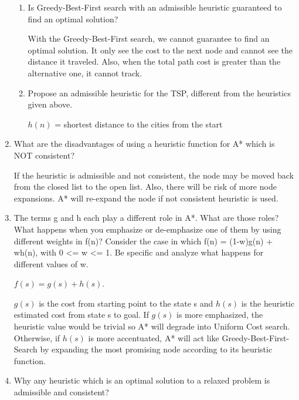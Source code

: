 \documentclass[12pt]{article}
\begin{document}
\begin{enumerate}
\begin{enumerate}
  \item Is Greedy-Best-First search with an admissible heuristic guaranteed to find an optimal solution? \par
  
  With the Greedy-Best-First search, we cannot guarantee to find an optimal solution. It only see the cost to the next node and cannot see the distance it traveled. Also,  when the total path cost is greater than the alternative one, it cannot track.
  
  \item Propose an admissible heuristic for the TSP, different from the heuristics given above. \par
  
  $h(n)$ = shortest distance to the cities from the start
  
  \end{enumerate}

\item What are the disadvantages of using a heuristic function for A* which is NOT consistent? \par

	If the heuristic is admissible and not consistent, the node may be moved back from the closed list to the open list. Also, there will be risk of more node expansions. A* will re-expand the node if not consistent heuristic is used. 

\item The terms g and h each play a different role in A*. What are those roles? What happens when you emphasize or de-emphasize one of them by using different weights in f(n)? Consider the case in which f(n) = (1-w)g(n) + wh(n), with 0 <= w <= 1. Be specific and analyze what happens for different values of w. \par

	\(f(s) = g(s) + h(s)\). \par
    \(g(s)\) is the cost from starting point to the state s and \(h(s)\) is the heuristic estimated cost from state s to goal. If \(g(s)\) is more emphasized, the heuristic value would be trivial so A* will degrade into Uniform Cost search. Otherwise, if \(h(s)\) is more accentuated, A* will act like Greedy-Best-First-Search by expanding the most promising node according to its heuristic function.

\item Why any heuristic which is an optimal solution to a relaxed problem is admissible and consistent? \par


\end{enumerate}
\end{document}
